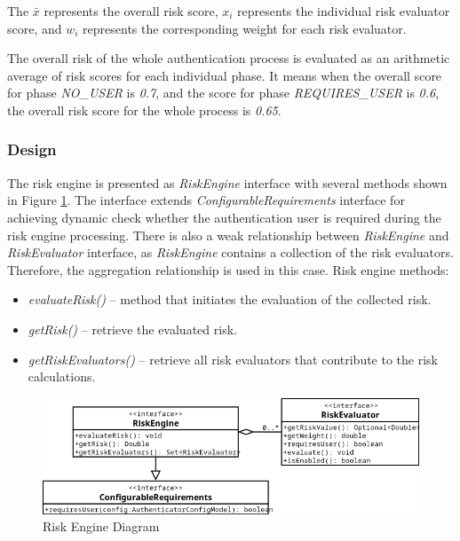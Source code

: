 The \( \bar{x} \) represents the overall risk score, \( x_i \) represents the individual risk evaluator score, and \( w_i \) represents the corresponding weight for each risk evaluator.

The overall risk of the whole authentication process is evaluated as an arithmetic average of risk scores for each individual phase.
It means when the overall score for phase \textit{NO\_USER} is \textit{0.7}, and the score for phase \textit{REQUIRES\_USER} is \textit{0.6}, the overall risk score for the whole process is \textit{0.65}. 

\newpage

\subsubsection{Design}
The risk engine is presented as \textit{RiskEngine} interface with several methods shown in Figure \ref{fig:design-user-engine-diagram}.
The interface extends \textit{ConfigurableRequirements} interface for achieving dynamic check whether the authentication user is required during the risk engine processing.
There is also a weak relationship between \textit{RiskEngine} and \textit{RiskEvaluator} interface, as \textit{RiskEngine} contains a collection of the risk evaluators.
Therefore, the aggregation relationship is used in this case. 
\newline
\newline
Risk engine methods:

\begin{itemize}
    \item \textit{evaluateRisk()} -- method that initiates the evaluation of the collected risk.
    \item \textit{getRisk()} -- retrieve the evaluated risk.
    \item \textit{getRiskEvaluators()} -- retrieve all risk evaluators that contribute to the risk calculations.
\end{itemize}

\begin{figure}[htbp]
  \centering
  \includegraphics[width=1\textwidth]{img/sections/5-design/risk-engine.png}
  \caption{Risk Engine Diagram}
  \label{fig:design-user-engine-diagram}
\end{figure}

